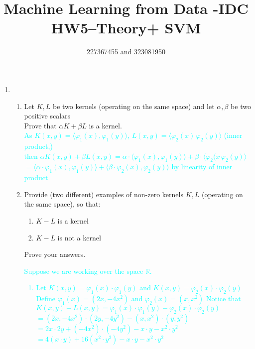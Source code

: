 \documentclass[12pt]{article}
\title{Machine Learning from Data -IDC\\HW5–Theory+ SVM}
\author{227367455 and 323081950}
\begin{document}
\maketitle

\begin{enumerate}
	\item  \hspace{1cm}
	\begin{enumerate}
		\item Let $K,L$ be two kernels (operating on the same space) and let $ \alpha, \beta $ be two positive scalars \\
		Prove that $\alpha K + \beta L $ is a kernel. \\
		\textcolor{cyan}{
		As $K(x,y) = \langle\varphi_{1}(x), \varphi_{1}(y)\rangle$, $L(x,y) = \langle\varphi_{2}(x)\, \varphi_{2}(y)\rangle$ (inner product,) \\
		then $\alpha K(x,y) + \beta L(x,y) = \alpha \cdot \langle \varphi_{1}(x),\varphi_{1}(y)\rangle + \beta \cdot \langle\varphi_{2}(x\,\varphi_{2}(y)\rangle $ \\
		$ = \langle \alpha \cdot \varphi_{1}(x),\varphi_{1}(y)\rangle + \langle\beta \cdot\varphi_{2}(x),\varphi_{2}(y)\rangle $ by linearity of inner product\\
		}
		\item Provide (two different) examples of non-zero kernels $K,L$ (operating on the same space), so that:
		\begin{enumerate}
			\item $K - L$ is a kernel
			\item $K - L$ is not a kernel
		\end{enumerate}
		Prove your answers. \\
		\textcolor{cyan}{
		Suppose we are working over the space $\mathbb{R}$.
		\begin{enumerate}
			\item Let $K(x,y) = \varphi_1(x)\cdot\varphi_1(y)$ and $K(x,y) = \varphi_2(x)\cdot\varphi_2(y)$ \\
			Define $\varphi_1(x) = (2x, -4x^2)$ and $\varphi_2(x) = (x, x^2) $
			Notice that $ K(x,y) - L(x,y) = \varphi_1(x)\cdot\varphi_1(y) - \varphi_2(x)\cdot\varphi_2(y) $ \\
			$ = (2x, -4x^2)\cdot(2y, -4y^2) - (x, x^2)\cdot(y,y^2) $ \\
			$ = 2x \cdot 2y + (-4x^2) \cdot (-4y^2) - x \cdot y - x^2 \cdot y^2 $ \\
			$ = 4(x \cdot y) + 16(x^2 \cdot y^2) - x \cdot y - x^2 \cdot y^2 $ \\

\end{enumerate}}
\end{enumerate}
\end{enumerate}
\end{document}
